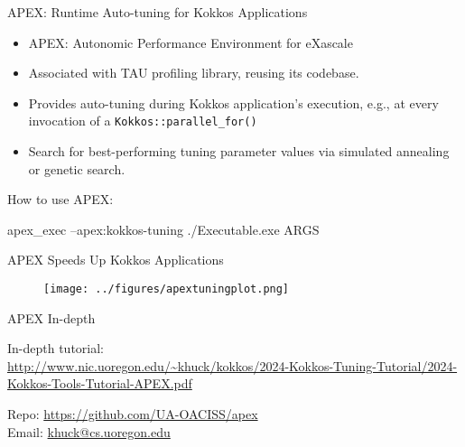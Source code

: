 \begin{frame}[fragile]{APEX: Runtime Auto-tuning for Kokkos Applications} 
\begin{itemize}
   \item APEX: Autonomic Performance Environment for eXascale 
   \item Associated with TAU profiling library, reusing its codebase.
   \item Provides auto-tuning during Kokkos application's execution, e.g., at every invocation of a \texttt{Kokkos::parallel\_for()}
   \item Search for best-performing tuning parameter values via simulated annealing or genetic search. 
\end{itemize}

\pause
How to use APEX:\\
	\begin{code}[mathescape=false]
apex_exec --apex:kokkos-tuning ./Executable.exe ARGS
\end{code}
\end{frame}

\begin{frame}[fragile]{APEX Speeds Up Kokkos Applications}

\begin{figure}
\texttt{[image: ../figures/apextuningplot.png]}
\end{figure}

\end{frame} 

\begin{frame}[fragile]{APEX In-depth}

\begin{center}
In-depth tutorial: \\
	\small \url{http://www.nic.uoregon.edu/~khuck/kokkos/2024-Kokkos-Tuning-Tutorial/2024-Kokkos-Tools-Tutorial-APEX.pdf}
\end{center}

\begin{center}
	Repo: \url{https://github.com/UA-OACISS/apex} \\	
	Email: \url{khuck@cs.uoregon.edu}
\end{center}

\end{frame}

